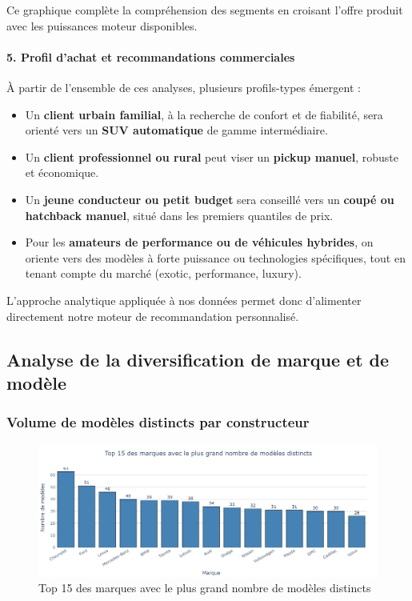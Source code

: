 \documentclass[12pt]{report}
\begin{document}
Ce graphique complète la compréhension des segments en croisant l’offre produit avec les puissances moteur disponibles.

\paragraph{5. Profil d’achat et recommandations commerciales}\mbox{}

\vspace{0.5cm}

À partir de l’ensemble de ces analyses, plusieurs profils-types émergent :
\begin{itemize}
  \item Un \textbf{client urbain familial}, à la recherche de confort et de fiabilité, sera orienté vers un \textbf{SUV automatique} de gamme intermédiaire.
  \item Un \textbf{client professionnel ou rural} peut viser un \textbf{pickup manuel}, robuste et économique.
  \item Un \textbf{jeune conducteur ou petit budget} sera conseillé vers un \textbf{coupé ou hatchback manuel}, situé dans les premiers quantiles de prix.
  \item Pour les \textbf{amateurs de performance ou de véhicules hybrides}, on oriente vers des modèles à forte puissance ou technologies spécifiques, tout en tenant compte du marché (exotic, performance, luxury).
\end{itemize}

L’approche analytique appliquée à nos données permet donc d’alimenter directement notre moteur de recommandation personnalisé.


\subsection{Analyse de la diversification de marque et de modèle}

\subsubsection{Volume de modèles distincts par constructeur}

\begin{figure}[H]
    \centering
    \includegraphics[width=1\textwidth]{Modele_marque.png}
    \caption{Top 15 des marques avec le plus grand nombre de modèles distincts}
    \label{fig:modele-marque}
\end{figure}
\end{document}

